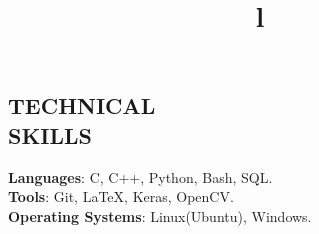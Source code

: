 \documentclass[margin]{res}
\begin{document}
\begin{resume}

\section{TECHNICAL\\SKILLS}
\textbf{Languages}: C, C++, Python,  Bash, SQL.
\\
\textbf{Tools}:  Git, \LaTeX,  Keras, OpenCV.
\\
\textbf{Operating Systems}:  Linux(Ubuntu), Windows.

\begin{format}
\title{l}\\
\\
\body\\
\end{format}


\end{resume}
\end{document}
